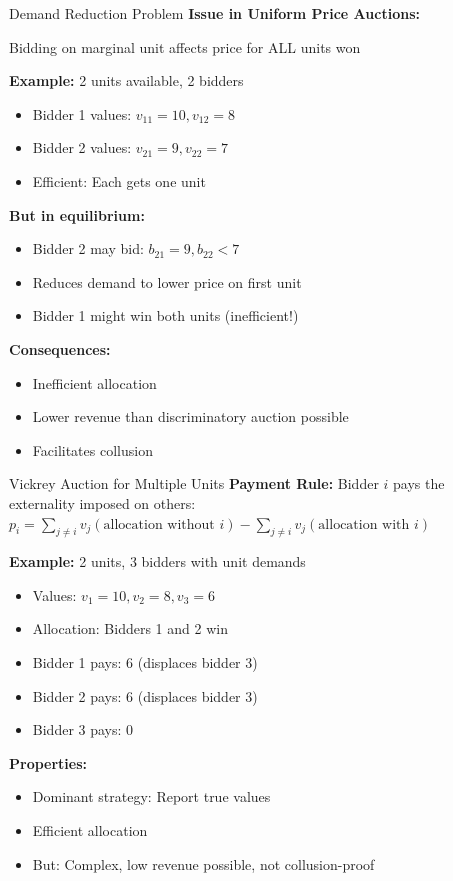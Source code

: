 \documentclass[xcolor={x11names}]{beamer}
\begin{document}
\begin{frame}{Demand Reduction Problem}
\textbf{Issue in Uniform Price Auctions:}

Bidding on marginal unit affects price for ALL units won


\textbf{Example:} 2 units available, 2 bidders
\begin{itemize}
  \item Bidder 1 values: $v_{11} = 10, v_{12} = 8$
  \item Bidder 2 values: $v_{21} = 9, v_{22} = 7$
  \item Efficient: Each gets one unit
\end{itemize}

\textbf{But in equilibrium:}
\begin{itemize}
  \item Bidder 2 may bid: $b_{21} = 9, b_{22} < 7$
  \item Reduces demand to lower price on first unit
  \item Bidder 1 might win both units (inefficient!)
\end{itemize}

\textbf{Consequences:}
\begin{itemize}
  \item Inefficient allocation
  \item Lower revenue than discriminatory auction possible
  \item Facilitates collusion
\end{itemize}
\end{frame}

\begin{frame}{Vickrey Auction for Multiple Units}
\textbf{Payment Rule:}
Bidder $i$ pays the externality imposed on others:
$p_i = \sum_{j \neq i} v_j(\text{allocation without } i) - \sum_{j \neq i} v_j(\text{allocation with } i)$


\textbf{Example:} 2 units, 3 bidders with unit demands
\begin{itemize}
  \item Values: $v_1 = 10, v_2 = 8, v_3 = 6$
  \item Allocation: Bidders 1 and 2 win
  \item Bidder 1 pays: $6$ (displaces bidder 3)
  \item Bidder 2 pays: $6$ (displaces bidder 3)
  \item Bidder 3 pays: $0$
\end{itemize}

\textbf{Properties:}
\begin{itemize}
  \item Dominant strategy: Report true values
  \item Efficient allocation
  \item But: Complex, low revenue possible, not collusion-proof
\end{itemize}
\end{frame}
\end{document}
